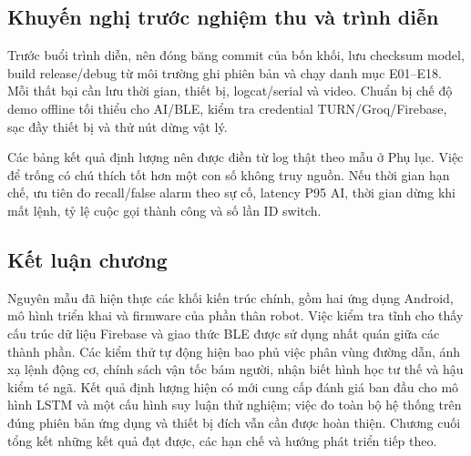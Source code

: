 \subsection{Khuyến nghị trước nghiệm thu và trình diễn}

Trước buổi trình diễn, nên đóng băng commit của bốn khối, lưu checksum model, build release/debug từ môi trường ghi phiên bản và chạy danh mục E01--E18. Mỗi thất bại cần lưu thời gian, thiết bị, logcat/serial và video. Chuẩn bị chế độ demo offline tối thiểu cho AI/BLE, kiểm tra credential TURN/Groq/Firebase, sạc đầy thiết bị và thử nút dừng vật lý.

Các bảng kết quả định lượng nên được điền từ log thật theo mẫu ở Phụ lục. Việc để trống có chú thích tốt hơn một con số không truy nguồn. Nếu thời gian hạn chế, ưu tiên đo recall/false alarm theo sự cố, latency P95 AI, thời gian dừng khi mất lệnh, tỷ lệ cuộc gọi thành công và số lần ID switch.

\subsection{Kết luận chương}

Nguyên mẫu đã hiện thực các khối kiến trúc chính, gồm hai ứng dụng Android, mô hình triển khai và firmware của phần thân robot. Việc kiểm tra tĩnh cho thấy cấu trúc dữ liệu Firebase và giao thức BLE được sử dụng nhất quán giữa các thành phần. Các kiểm thử tự động hiện bao phủ việc phân vùng đường dẫn, ánh xạ lệnh động cơ, chính sách vận tốc bám người, nhận biết hình học tư thế và hậu kiểm té ngã. Kết quả định lượng hiện có mới cung cấp đánh giá ban đầu cho mô hình LSTM và một cấu hình suy luận thử nghiệm; việc đo toàn bộ hệ thống trên đúng phiên bản ứng dụng và thiết bị đích vẫn cần được hoàn thiện. Chương cuối tổng kết những kết quả đạt được, các hạn chế và hướng phát triển tiếp theo.
